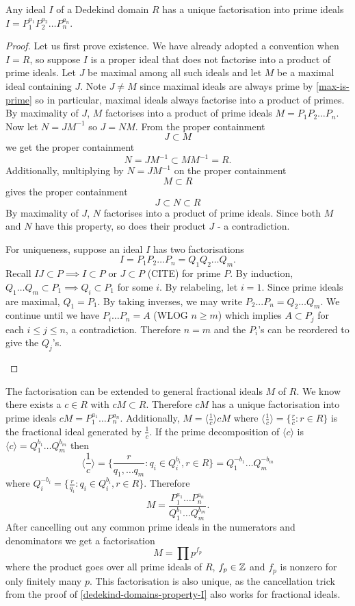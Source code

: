 \begin{theorem} \label{dedekind-domains-property-I}

Any ideal $I$ of a Dedekind domain $R$ has a unique factorisation into prime ideals
$I=P_1^{a_1}P_2^{a_2}\dots P_n^{a_n}$.
\end{theorem}
\begin{proof}
Let us first prove existence. We have already adopted a convention when $I=R$, so suppose $I$ is a proper ideal that does not factorise into a product of prime ideals. Let $J$ be maximal among all such ideals and let $M$ be a maximal ideal containing $J$. Note $J\neq M$ since maximal ideals are always prime by \cref{max-is-prime} so in particular, maximal ideals always factorise into a product of primes. By maximality of $J$, $M$ factorises into a product of prime ideals $M=P_1P_2\dots P_n$. Now let $N=JM^{-1}$ so $J=NM.$
From the proper containment
$$J\subset M$$
we get the proper containment
$$N=JM^{-1}\subset MM^{-1}=R.$$
Additionally, multiplying by $N=JM^{-1}$ on the proper containment
$$M\subset R$$
gives the proper containment
$$J\subset N\subset R$$
By maximality of $J$, $N$ factorises into a product of prime ideals. Since both $M$ and $N$ have this property, so does their product $J$ - a contradiction.

For uniqueness, suppose an ideal $I$ has two factorisations
$$I=P_1P_2\dots P_n=Q_1Q_2\dots Q_m.$$
Recall $IJ\subset P\implies I\subset P$ or $J\subset P$ (CITE) for prime $P$. By induction,
$Q_1\dots Q_m\subset P_1\implies Q_i\subset P_1$ for some $i$. By relabeling, let $i=1$. Since prime ideals are maximal, $Q_1=P_1$. By taking inverses, we may write $P_2...P_n=Q_2\dots Q_m$. We continue until we have $P_i\dots P_n=A$ (WLOG $n\geq m$) which implies $A\subset P_j$ for each $i\leq j \leq n$, a contradiction. Therefore $n=m$ and the $P_i$'s can be reordered to give the $Q_j$'s.

\cite{Wright}
\end{proof}

The factorisation can be extended to general fractional ideals $M$ of $R$. We know there exists a $c\in R$ with $cM\subset R$. Therefore $cM$ has a unique factorisation into prime ideals $cM=P_1^{a_1}\dots P_n^{a_n}$. Additionally, $M=\langle \frac{1}{c}\rangle cM$ where $\langle \frac{1}{c}\rangle=\{\frac{r}{c}:r\in R\}$ is the fractional ideal generated by $\frac{1}{c}$. If the prime decomposition of  $\langle c \rangle$ is $\langle c \rangle=Q_1^{b_1}\dots Q_m^{b_m}$ then $$\langle \frac{1}{c}\rangle=\{\frac{r}{q_1,\dots q_m}:q_i\in Q_i^{b_i}, r\in R\}=Q_1^{-b_1}\dots Q_m^{-b_m}$$ where $Q_i^{-b_i}=\{\frac{r}{q_i}:q_i\in Q_i^{b_i},r\in R\}$. Therefore
$$M=\frac{P_1^{a_1}\dots P_n^{a_n}}{Q_1^{b_1}\dots Q_m^{b_m}}.$$
After cancelling out any common prime ideals in the numerators and denominators we get a factorisation
$$M=\prod p^{f_p}$$
where the product goes over all prime ideals of $R$, $f_p\in \mathbb{Z}$ and $f_p$ is nonzero for only finitely many $p.$ This factorisation is also unique, as the cancellation trick from the proof of \cref{dedekind-domains-property-I} also works for fractional ideals.

